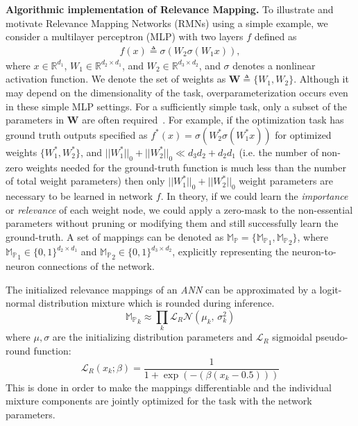 \documentclass{article}
\begin{document}
\textbf{Algorithmic implementation of Relevance Mapping.}
To illustrate and motivate Relevance Mapping Networks (RMNs) using a simple example, we consider a multilayer perceptron (MLP) with two layers $f$ 
defined as 
\begin{eqnarray}
	f(x) \triangleq \sigma(W_2 \sigma( W_1 x)),
\end{eqnarray}
where $x \in \mathbb{R}^{d_1}$, $W_1 \in \mathbb{R}^{d_2 \times d_1}$, and $W_2 \in \mathbb{R}^{d_3 \times d_2}$, and $\sigma$ denotes a nonlinear activation function. We denote the set of weights as $\mathbf{W} \triangleq \{ W_1, W_2 \}$. Although it may depend on the dimensionality of the task, overparameterization occurs even in these simple MLP settings. For a sufficiently simple task, only a subset of the parameters in $\mathbf{W}$ are often required~\cite{frankle2019lottery}. For example, if the optimization task has ground truth outputs specified as $f^*(x) =  \sigma(W_2^* \sigma( W_1^* x))$ for optimized weights $\{ W_1^*, W_2^* \} $, and $||W_1^*||_0 + ||W_2^*||_0 \ll d_3 d_2 + d_2 d_1$ (i.e. the number of non-zero weights needed for the ground-truth function is much less than the number of total weight parameters) then only $||W_1^*||_0 + ||W_2^*||_0$ weight parameters are necessary to be learned in network $f$. In theory, if we could learn the \textit{importance} or \textit{relevance} of each weight node, we could apply a zero-mask to the non-essential parameters without pruning or modifying them and still successfully learn the ground-truth. A set of mappings can be denoted as $\mathbb{M_P} = \{ \mathbb{M_P}_1, \mathbb{M_P}_2 \}$, where $\mathbb{M_P}_1 \in \{0, 1\}^{d_2 \times d_1}$ and $\mathbb{M_P}_2 \in \{0, 1\}^{d_3 \times d_2}$, explicitly representing the neuron-to-neuron connections of the network.
\iffalse
After learning this supposed task, if another mapping needs to be learned in addition to the $f^*$ mapping, then we can zero-mask the parameters of $f$ essential for the $f^*$ mapping, leaving the rest of the  $d_3 d_2 + d_2 d_1 - ||W_1^*||_0 - ||W_2^*||_0$ parameters for the new task, without affecting the previous task's performance. Additionally, we can choose to use the previous task parameters, in part or entirely, instead of masking them out. This would be inherently dependent on the similarity between tasks and data, data sequence, optimization methodology and initialization of the network.
\fi
The initialized relevance mappings of an \textit{ANN} can be approximated by a logit-normal distribution mixture which is rounded during inference. 
\begin{equation*}
    \mathbb{M_P}_k \approx \prod_k \mathcal{L}_R\mathcal{N}(\mu_k,\,\sigma_k^{2})
\end{equation*} where $\mu,\sigma$ are the initializing distribution parameters and $\mathcal{L}_R$ sigmoidal pseudo-round function: \begin{equation}
\mathcal{L}_R(x_k; \beta) = \frac{1}{1 + \exp(-(\beta (x_k - 0.5)))}
\end{equation}
This is done in order to make the mappings differentiable and the individual mixture components are jointly optimized for the task with the network parameters.
\end{document}
